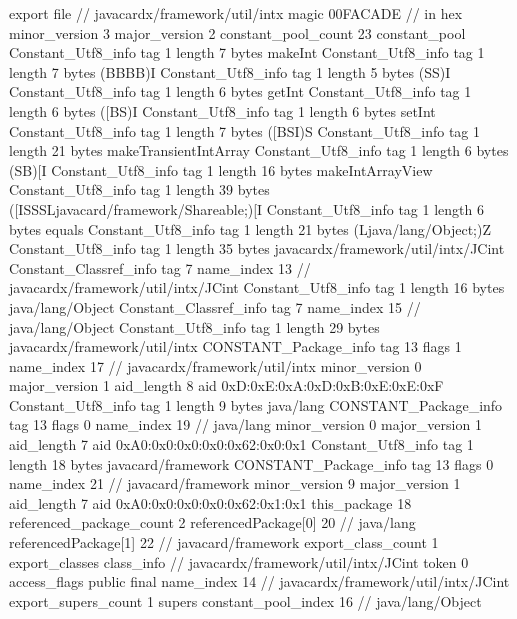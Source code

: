 export file {		// javacardx/framework/util/intx
	magic	00FACADE		 // in hex
	minor_version	3
	major_version	2
	constant_pool_count	23
	constant_pool {
		Constant_Utf8_info {
			tag	1
			length	7
			bytes	makeInt
		}
		Constant_Utf8_info {
			tag	1
			length	7
			bytes	(BBBB)I
		}
		Constant_Utf8_info {
			tag	1
			length	5
			bytes	(SS)I
		}
		Constant_Utf8_info {
			tag	1
			length	6
			bytes	getInt
		}
		Constant_Utf8_info {
			tag	1
			length	6
			bytes	([BS)I
		}
		Constant_Utf8_info {
			tag	1
			length	6
			bytes	setInt
		}
		Constant_Utf8_info {
			tag	1
			length	7
			bytes	([BSI)S
		}
		Constant_Utf8_info {
			tag	1
			length	21
			bytes	makeTransientIntArray
		}
		Constant_Utf8_info {
			tag	1
			length	6
			bytes	(SB)[I
		}
		Constant_Utf8_info {
			tag	1
			length	16
			bytes	makeIntArrayView
		}
		Constant_Utf8_info {
			tag	1
			length	39
			bytes	([ISSSLjavacard/framework/Shareable;)[I
		}
		Constant_Utf8_info {
			tag	1
			length	6
			bytes	equals
		}
		Constant_Utf8_info {
			tag	1
			length	21
			bytes	(Ljava/lang/Object;)Z
		}
		Constant_Utf8_info {
			tag	1
			length	35
			bytes	javacardx/framework/util/intx/JCint
		}
		Constant_Classref_info {
			tag	7
			name_index	13		// javacardx/framework/util/intx/JCint
		}
		Constant_Utf8_info {
			tag	1
			length	16
			bytes	java/lang/Object
		}
		Constant_Classref_info {
			tag	7
			name_index	15		// java/lang/Object
		}
		Constant_Utf8_info {
			tag	1
			length	29
			bytes	javacardx/framework/util/intx
		}
		CONSTANT_Package_info {
			tag	13
			flags	1
			name_index	17		// javacardx/framework/util/intx
			minor_version	0
			major_version	1
			aid_length	8
			aid	0xD:0xE:0xA:0xD:0xB:0xE:0xE:0xF
		}
		Constant_Utf8_info {
			tag	1
			length	9
			bytes	java/lang
		}
		CONSTANT_Package_info {
			tag	13
			flags	0
			name_index	19		// java/lang
			minor_version	0
			major_version	1
			aid_length	7
			aid	0xA0:0x0:0x0:0x0:0x62:0x0:0x1
		}
		Constant_Utf8_info {
			tag	1
			length	18
			bytes	javacard/framework
		}
		CONSTANT_Package_info {
			tag	13
			flags	0
			name_index	21		// javacard/framework
			minor_version	9
			major_version	1
			aid_length	7
			aid	0xA0:0x0:0x0:0x0:0x62:0x1:0x1
		}
	}
	this_package	18
	referenced_package_count	2
	referencedPackage[0]	20		// java/lang
	referencedPackage[1]	22		// javacard/framework
	export_class_count	1
	export_classes {
		class_info {		// javacardx/framework/util/intx/JCint
			token	0
			access_flags	public final
			name_index	14		// javacardx/framework/util/intx/JCint
			export_supers_count	1
			supers {
				constant_pool_index	16		// java/lang/Object
}}}}

